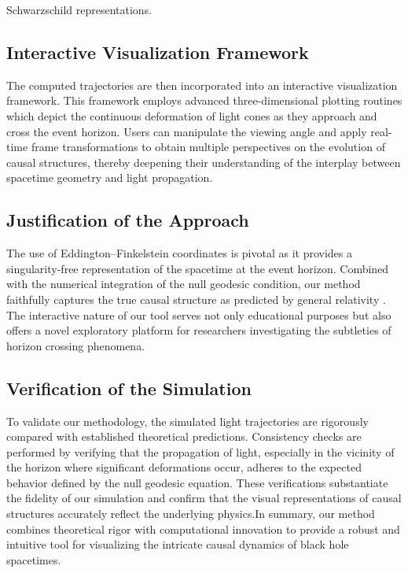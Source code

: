 \documentclass{article}
\begin{document}
Schwarzschild representations.\subsection{Interactive Visualization Framework}The computed trajectories are then incorporated into an interactive visualization framework. This framework employs advanced three-dimensional plotting routines which depict the continuous deformation of light cones as they approach and cross the event horizon. Users can manipulate the viewing angle and apply real-time frame transformations to obtain multiple perspectives on the evolution of causal structures, thereby deepening their understanding of the interplay between spacetime geometry and light propagation.\subsection{Justification of the Approach}The use of Eddington--Finkelstein coordinates is pivotal as it provides a singularity-free representation of the spacetime at the event horizon. Combined with the numerical integration of the null geodesic condition, our method faithfully captures the true causal structure as predicted by general relativity \cite{ref1, ref2}. The interactive nature of our tool serves not only educational purposes but also offers a novel exploratory platform for researchers investigating the subtleties of horizon crossing phenomena.\subsection{Verification of the Simulation}To validate our methodology, the simulated light trajectories are rigorously compared with established theoretical predictions. Consistency checks are performed by verifying that the propagation of light, especially in the vicinity of the horizon where significant deformations occur, adheres to the expected behavior defined by the null geodesic equation. These verifications substantiate the fidelity of our simulation and confirm that the visual representations of causal structures accurately reflect the underlying physics.In summary, our method combines theoretical rigor with computational innovation to provide a robust and intuitive tool for visualizing the intricate causal dynamics of black hole spacetimes.
\end{document}
